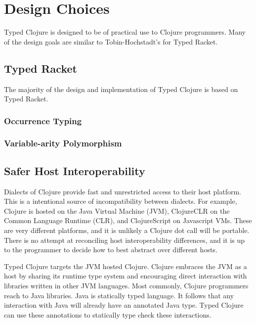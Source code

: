 \chapter{Design Choices}

Typed Clojure is designed to be of practical use to Clojure programmers.
Many of the design goals are similar to Tobin-Hochstadt's \cite{Tob10}
for Typed Racket.

\section{Typed Racket}

The majority of the design and implementation of Typed Clojure is based on Typed Racket.

\subsection{Occurrence Typing}

\subsection{Variable-arity Polymorphism}

\section{Safer Host Interoperability}

Dialects of Clojure provide fast and unrestricted access to their host platform. 
This is a intentional source of incompatibility between dialects.
For example, Clojure is hosted on the Java Virtual Machine (JVM), ClojureCLR on the Common Language Runtime (CLR),
and ClojureScript on Javascript VMs. These are very different platforms, and it is unlikely
a Clojure dot call will be portable. There is no attempt at reconciling
host interoperability differences, and it is up to the programmer to decide
how to best abstract over different hosts.

Typed Clojure targets the JVM hosted Clojure.
Clojure embraces the JVM as a host by sharing its runtime type system and encouraging direct
interaction with libraries written in other JVM languages. Most commonly, Clojure programmers
reach to Java libraries. Java is statically typed language. It follows that any interaction with
Java will already have an annotated Java type. Typed Clojure can use these annotations
to statically type check these interactions.

